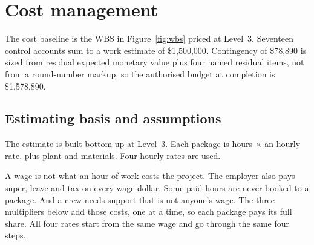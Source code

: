 \section{Cost management}
\label{sec:cost}

The cost baseline is the WBS in Figure~\ref{fig:wbs} priced at Level~3. Seventeen control accounts sum to a work estimate of \$1{,}500{,}000. Contingency of \$78{,}890 is sized from residual expected monetary value plus four named residual items, not from a round-number markup, so the authorised budget at completion is \$1{,}578{,}890.

\subsection{Estimating basis and assumptions}
\label{sec:cost-basis}

The estimate is built bottom-up at Level~3. Each package is hours $\times$ an hourly rate, plus plant and materials. Four hourly rates are used.

A wage is not what an hour of work costs the project. The employer also pays super, leave and tax on every wage dollar. Some paid hours are never booked to a package. And a crew needs support that is not anyone's wage. The three multipliers below add those costs, one at a time, so each package pays its full share. All four rates start from the same wage and go through the same four steps.

